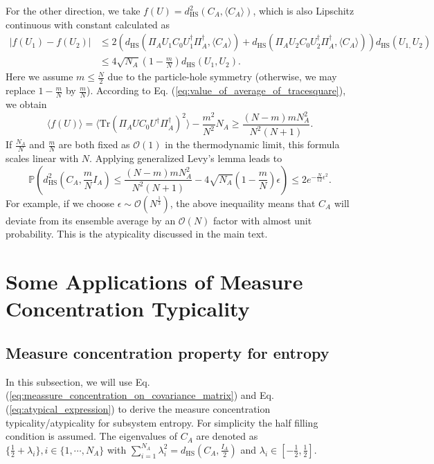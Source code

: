 \documentclass[aps,onecolumn,nofootinbib,superscriptaddress,notitlepage,longbibliography]{revtex4-1}
\begin{document}
For the other direction, %
we take $f(U)=d_{\mathrm{HS}}^{2}(C_{A},\langle C_{A}\rangle)$,
which %
is also Lipschitz continuous with constant calculated as
\begin{align}
|f(U_{1})-f(U_{2})| & \leq2(d_{\mathrm{HS}}(\Pi_{A}U_{1}C_{0}U_{1}^{\dagger}\Pi_{A}^{\dagger},\langle C_{A}\rangle)+d_{\mathrm{HS}}(\Pi_{A}U_{2}C_{0}U_{2}^{\dagger}\Pi_{A}^{\dagger},\langle C_{A}\rangle))d_{\mathrm{HS}}(U_{1,}U_{2})\nonumber \\
 & \leq4\sqrt{N_{A}}\left(1-\frac{m}{N}\right)d_{\mathrm{HS}}(U_{1},U_{2}).
\end{align}
Here we assume $m\leq\frac{N}{2}$ due to the particle-hole symmetry (otherwise, we may replace $1-\frac{m}{N}$ by $\frac{m}{N}$). According to Eq. (\ref{eq:value_of_average_of_tracesquare}), we obtain
\begin{equation}
\langle f(U)\rangle=\langle\mathrm{Tr}(\Pi_{A}UC_{0}U^{\dagger}\Pi_{A}^{\dagger})^{2}\rangle-\frac{m^{2}}{N^{2}}N_{A}\geq\frac{(N-m)mN_{A}^{2}}{N^{2}(N+1)}.
\end{equation}
If $\frac{N_{A}}{N}$ and $\frac{m}{N}$ are both fixed as $\mathcal{O}(1)$ in the thermodynamic limit, this formula scales linear with $N$. Applying generalized
Levy's lemma leads to 
\begin{equation}
\mathbb{P}\left(d_{\mathrm{HS}}^{2}\left(C_{A},\frac{m}{N}I_{A}\right)\leq\frac{(N-m)mN_{A}^{2}}{N^{2}(N+1)}-4\sqrt{N_{A}}\left(1-\frac{m}{N}\right)\epsilon\right)\leq2e^{-\frac{N}{12}\epsilon^{2}}. 
\label{eq:atypical_expression}
\end{equation}
For example, if we choose $\epsilon\sim\mathcal{O}(N^{\frac{1}{3}})$,
the above inequaility means that $C_{A}$ will deviate from its
ensemble average by an $\mathcal{O}(N)$ factor with almost unit probability. %
This is the atypicality discussed in the main text. 


\section{Some Applications of Measure Concentration Typicality}

\subsection{Measure concentration property for entropy}

In this subsection, we will use Eq. (\ref{eq:meassure_concentration_on_covariance_matrix})
and Eq. (\ref{eq:atypical_expression}) to derive the measure concentration
typicality/atypicality for subsystem entropy. For simplicity the half
filling condition is assumed. The eigenvalues of $C_{A}$ are denoted
as $\{\frac{1}{2}+\lambda_{i}\},i\in\{1,\cdots,N_{A}\}$ with $\sum_{i=1}^{N_{A}}\lambda_{i}^{2}=d_{\mathrm{HS}}(C_{A},\frac{I_{A}}{2})$
and $\lambda_{i}\in[-\frac{1}{2},\frac{1}{2}]$.
\end{document}
